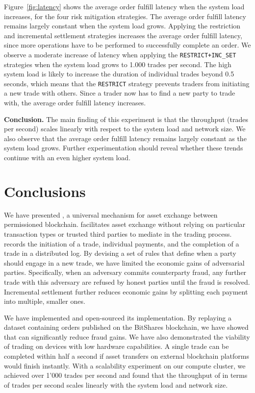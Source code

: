 Figure~\ref{fig:latency} shows the average order fulfill latency when the system load increases, for the four risk mitigation strategies.
The average order fulfill latency remains largely constant when the system load grows.
Applying the restriction and incremental settlement strategies increases the average order fulfill latency, since more operations have to be performed to successfully complete an order.
We observe a moderate increase of latency when applying the \texttt{RESTRICT+INC\_SET} strategies when the system load grows to 1.000 trades per second.
The high system load is likely to increase the duration of individual trades beyond 0.5 seconds, which means that the \texttt{RESTRICT} strategy prevents traders from initiating a new trade with others.
Since a trader now has to find a new party to trade with, the average order fulfill latency increases.

\textbf{Conclusion.}
The main finding of this experiment is that the throughput (trades per second) scales linearly with respect to the system load and network size.
We also observe that the average order fulfill latency remains largely constant as the system load grows.
Further experimentation should reveal whether these trends continue with an even higher system load.

\section{Conclusions}
We have presented \ModelName{}, a universal mechanism for asset exchange between permissioned blockchain.
\ModelName{} facilitates asset exchange without relying on particular transaction types or trusted third parties to mediate in the trading process.
\ModelName{} records the initiation of a trade, individual payments, and the completion of a trade in a distributed log.
By devising a set of rules that define when a party should engage in a new trade, we have limited the economic gains of adversarial parties.
Specifically, when an adversary commits counterparty fraud, any further trade with this adversary are refused by honest parties until the fraud is resolved.
Incremental settlement further reduces economic gains by splitting each payment into multiple, smaller ones.

We have implemented \ModelName{} and open-sourced its implementation.
By replaying a dataset containing orders published on the BitShares blockchain, we have showed that \ModelName{} can significantly reduce fraud gains.
We have also demonstrated the viability of trading on devices with low hardware capabilities.
A single trade can be completed within half a second if asset transfers on external blockchain platforms would finish instantly.
With a scalability experiment on our compute cluster, we achieved over 1'000 trades per second and found that the throughput of \ModelName{} in terms of trades per second scales linearly with the system load and network size.

